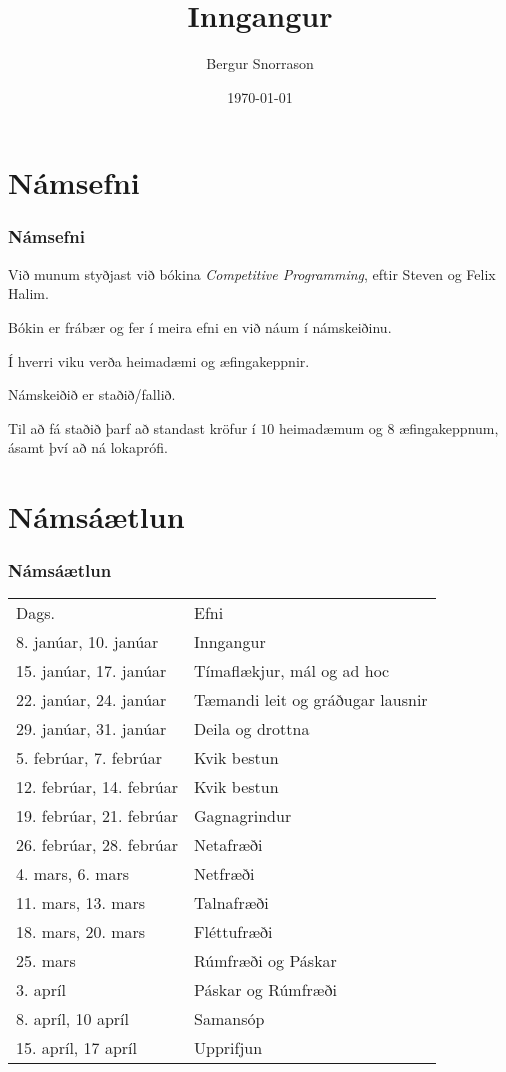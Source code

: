 \title{Inngangur}
\author{Bergur Snorrason}
\date{\today}



\frame{\titlepage}

\section{Námsefni}
{
    \frametitle{Námsefni}
    {
        \item<1-> Við munum styðjast við bókina \emph{Competitive Programming}, eftir Steven og Felix Halim.
        \item<2-> Bókin er frábær og fer í meira efni en við náum í námskeiðinu.
        \item<3-> Í hverri viku verða heimadæmi og æfingakeppnir.
        \item<4-> Námskeiðið er staðið/fallið.
        \item<5-> Til að fá staðið þarf að standast kröfur í $10$ heimadæmum og $8$ æfingakeppnum,
                    ásamt því að ná lokaprófi.
    }
}

\section{Námsáætlun}
{
    \frametitle{Námsáætlun}
    \begin{tabular}{l l}
        Dags. & Efni\\
        8. janúar, 10. janúar & Inngangur\\
        15. janúar, 17. janúar & Tímaflækjur, mál og ad hoc\\
        22. janúar, 24. janúar & Tæmandi leit og gráðugar lausnir\\
        29. janúar, 31. janúar & Deila og drottna\\
        5. febrúar, 7. febrúar & Kvik bestun\\
        12. febrúar, 14. febrúar & Kvik bestun\\
        19. febrúar, 21. febrúar & Gagnagrindur\\
        26. febrúar, 28. febrúar & Netafræði\\
        4. mars, 6. mars & Netfræði\\
        11. mars, 13. mars & Talnafræði\\
        18. mars, 20. mars & Fléttufræði\\
        25. mars & Rúmfræði og Páskar\\
        3. apríl & Páskar og Rúmfræði\\
        8. apríl, 10 apríl & Samansóp\\
        15. apríl, 17 apríl & Upprifjun\\
    \end{tabular}
}

